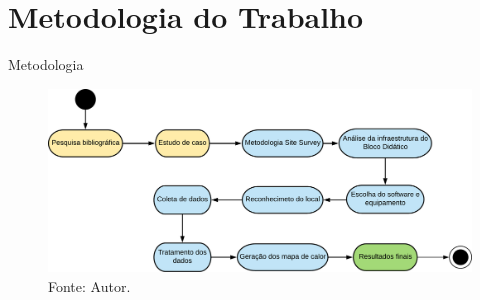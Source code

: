 \documentclass[aspectratio=169,12pt]{beamer}
\begin{document}
\section{Metodologia do Trabalho}
\begin{frame}{Metodologia}
	\vspace*{-.1cm}
	\begin{figure}[H]
		\centering
		\includegraphics[scale=.32]{fig_tcc/slide_metodologia.pdf}
		\caption*{{\footnotesize Fonte: Autor.}}
	\end{figure}
\end{frame}
\end{document}
